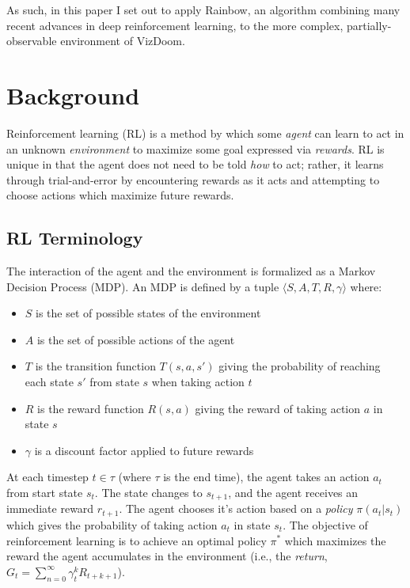 \documentclass[letterpaper]{article}
\begin{document}
	As such, in this paper I set out to apply Rainbow, an algorithm combining many recent advances in deep reinforcement learning, to the more complex, partially-observable environment of VizDoom.
	
	\section{Background}
	
	Reinforcement learning (RL) is a method by which some \textit{agent} can learn to act in an unknown \textit{environment} to maximize some goal expressed via \textit{rewards}. RL is unique in that the agent does not need to be told \textit{how} to act; rather, it learns through trial-and-error by encountering rewards as it acts and attempting to choose actions which maximize future rewards.
	
	\subsection{RL Terminology}
	 
	 The interaction of the agent and the environment is formalized as a Markov Decision Process (MDP). An MDP is defined by a tuple $\langle S, A, T, R, \gamma \rangle$ where:
	 \begin{itemize}
	 	\item $S$ is the set of possible states of the environment
	 	\item $A$ is the set of possible actions of the agent
	 	\item $T$ is the transition function $T(s,a,s')$ giving the probability of reaching each state $s'$ from state $s$ when taking action $t$
	 	\item $R$ is the reward function $R(s,a)$ giving the reward of taking action $a$ in state $s$
	 	\item $\gamma$ is a discount factor applied to future rewards
	 \end{itemize}
 	
 	At each timestep $t\in \tau$ (where $\tau$ is the end time), the agent takes an action $a_t$ from start state $s_t$. The state changes to $s_{t+1}$, and the agent receives an immediate reward $r_{t+1}$. The agent chooses it's action based on a \textit{policy} $\pi (a_t|s_t)$ which gives the probability of taking action $a_t$ in state $s_t$. The objective of reinforcement learning is to achieve an optimal policy $\pi^*$ which maximizes the reward the agent accumulates in the environment (i.e., the \textit{return}, $G_t=\sum_{n=0}^{\infty}\gamma^k_tR_{t+k+1}$). 
 	
\end{document}
